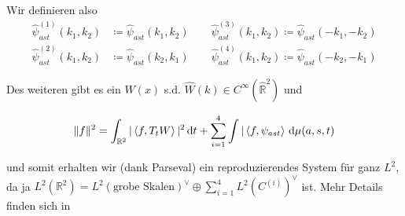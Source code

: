 Wir definieren also
\begin{align}
    \hat \psi_{ast}^{(1)} (k_1, k_2) &\coloneqq \hat\psi_{ast} (k_1,k_2)
    \qquad
    \hat\psi_{ast}^{(3)}(k_1,k_2) \coloneqq \hat\psi_{ast} (-k_1,-k_2)
    \nonumber\\
    \hat \psi_{ast}^{(2)} (k_1, k_2) &\coloneqq \hat\psi_{ast} (k_2,k_1)
    \qquad
    \hat\psi_{ast}^{(4)}(k_1, k_2) \coloneqq \hat\psi_{ast} (-k_2,-k_1)
    \label{eq:psi(i)}
\end{align}

Des weiteren gibt es ein $W(x)$ s.d. $\hat W(k) \in C^\infty (\hat{\mathbb{R}}^2)$ und

\begin{align*}
    \Vert f \Vert^2 =
    \int_{\mathbb{R}^2} |\left\langle f, T_t W \right\rangle|^2 \mathop{}\!\mathrm{d} t
    + \sum_{i=1}^4 \int |\left\langle f, \psi_{ast} \right\rangle \, \mathop{}\!\mathrm{d} \mu (a,s,t)
\end{align*}

und somit erhalten wir (dank Parseval) ein reproduzierendes System für ganz $L^2$, da ja
$L^2 (\mathbb{R}^2) = L^2 (\textrm{grobe Skalen})^\vee \oplus \sum_{i=1}^4 L^2 \left(C^{(i)}\right)^\vee$ ist. Mehr Details finden sich in \cite[S. 28 ff]{Kutyniok2008}






